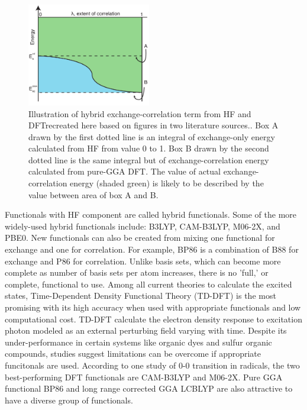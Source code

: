 \documentclass[
journal=jpcbfk, %
manuscript=article]{achemso}
\begin{document}
	\begin{figure}
		\vspace{-10pt}
		\centering
		\includegraphics[width=0.48\textwidth]{images/xcDFT.pdf}
		\caption{Illustration of hybrid exchange-correlation term from HF and DFTrecreated here based on figures in two literature sources.\cite{Cramer2005, Bersier}. Box A drawn by the first dotted line is an integral of exchange-only energy calculated from HF from \textlambda value 0 to 1. Box B drawn by the second dotted line is the same integral but of exchange-correlation energy calculated from pure-GGA DFT. The value of actual exchange-correlation energy (shaded green) is likely to be described by the value between area of box A and B.}\label{fig:xcDFT}
		\vspace{-15pt}
	\end{figure}
	Functionals with HF component are called hybrid functionals.  Some of the more widely-used hybrid functionals include: B3LYP, CAM-B3LYP\cite{Yanai2004}, M06-2X\cite{Zhao2007}, and PBE0\cite{Adamo1999}. New functionals can also be created from mixing one functional for exchange and one for correlation. For example, BP86 is a combination of B88 for exchange and P86 for correlation. Unlike basis sets, which can become more complete as number of basis sets per atom increases, there is no 'full,' or complete, functional to use. 
	Among all current theories to calculate the excited states, Time-Dependent Density Functional Theory (TD-DFT) is the most promising with its high accuracy when used with appropriate functionals and low computational cost\cite{Magyar2007}. TD-DFT calculate the electron density response to excitation photon modeled as an external perturbing field varying with time.\cite{Runge1984}  Despite its under-performance in certain systems like organic dyes\cite{Caricato2004} and sulfur organic compounds\cite{Fabian2001}, studies suggest limitations can be overcome if appropriate funcitonals are used.\cite{Barone2007a, Jacquemin2009}  According to one study of 0-0 transition in radicals, the two best-performing DFT functionals are CAM-B3LYP and M06-2X. Pure GGA functional BP86\cite{Becke1988,Perdew1986} and long range corrected GGA  LCBLYP\cite{Iikura2001,Lee1988,Becke1988} are also attractive to have a diverse group of functionals.
	
\end{document}
